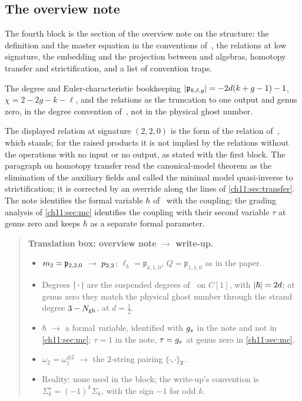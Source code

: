

\subsection*{The overview note}

The fourth block is the section of the overview note on the \IBL{} structure: the definition and the master equation in the conventions of~\cite{Cieliebak:2015:HomologicalAlgebraRelated}, the relations at low signature, the embedding and the projection between \Loo{} and \IBL{} algebras, homotopy transfer and strictification, and a list of convention traps.

\noindent{} The degree and Euler-characteristic bookkeeping $\abs{\mathfrak{p}_{k, \ell, g}} = - 2 d (k + g - 1) - 1$, $\chi = 2 - 2 g - k - \ell$, and the \Loo{} relations as the truncation to one output and genus zero, in the degree convention of~\cite{Cieliebak:2015:HomologicalAlgebraRelated}, not in the physical ghost number.

The displayed relation at signature $(2, 2, 0)$ is the form of the relation of~\cite{Cieliebak:2015:HomologicalAlgebraRelated}, which stands; for the raised products it is not implied by the \Loo{} relations without the operations with no input or no output, as stated with the first block.
The paragraph on homotopy transfer read the canonical-model theorem as the elimination of the auxiliary fields and called the minimal model quasi-inverse to strictification; it is corrected by an override along the lines of \cref{ch11:sec:transfer}.
The note identifies the formal variable $\hbar$ of~\cite{Cieliebak:2015:HomologicalAlgebraRelated} with the coupling; the grading analysis of \cref{ch11:sec:mc} identifies the coupling with their second variable $\tau$ at genus zero and keeps $\hbar$ as a separate formal parameter.

\begin{quote}
  \small
  \textbf{Translation box: overview note $\to$ write-up.}
  \begin{itemize}
    \setlength{\itemsep}{0.3ex}
    \item $\mtwo = \mathfrak{p}_{2, 2, 0}$ $\to$ $\sprod{2}{2}$; $\ell_k = \mathfrak{p}_{k, 1, 0}$, $Q = \mathfrak{p}_{1, 1, 0}$ as in the paper.
    \item Degrees $\abs{\cdot}$ are the suspended degrees of~\cite{Cieliebak:2015:HomologicalAlgebraRelated} on $C[1]$, with $\abs{\hbar} = 2 d$; at genus zero they match the physical ghost number through the strand degree $3 - \Ngh$, at $d = \tfrac{1}{2}$.
    \item $\hbar$ $\to$ a formal variable, identified with $\gs$ in the note and not in \cref{ch11:sec:mc}; $\tau = 1$ in the note, $\tau = \gs$ at genus zero in \cref{ch11:sec:mc}.
    \item $\omega_2 = \omega_1^{\otimes 2}$ $\to$ the $2$-string pairing $\pair[2]{\cdot}{\cdot}$.
    \item Reality: none used in the block; the write-up's convention is $\Sigma_k^\star = (-1)^k \Sigma_k$, with the sign $-1$ for odd $k$.
  \end{itemize}
\end{quote}

